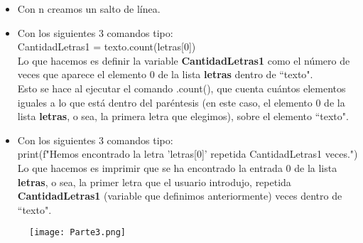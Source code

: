 \documentclass[15pt]{article}
\begin{document}
\begin{itemize}

    \item Con n creamos un salto de línea.
    \item Con los siguientes 3 comandos tipo:\\
    
    CantidadLetras1 = texto.count(letras[0])\\
    
    Lo que hacemos es definir la variable \textbf{CantidadLetras1} como el número de veces que aparece el elemento 0 de la lista \textbf{letras} dentro de ``texto".\\

    Esto se hace al ejecutar el comando .count(), que cuenta cuántos elementos iguales a lo que está dentro del paréntesis (en este caso, el elemento 0 de la lista \textbf{letras}, o sea, la primera letra que elegimos), sobre el elemento ``texto".
    \item Con los siguientes 3 comandos tipo:\\
    
    print(f"Hemos encontrado la letra '{letras[0]}' repetida {CantidadLetras1} veces.")\\

    Lo que hacemos es imprimir que se ha encontrado la entrada 0 de la lista \textbf{letras}, o sea, la primer letra que el usuario introdujo, repetida \textbf{CantidadLetras1} (variable que definimos anteriormente) veces dentro de ``texto".

\end{itemize}

\begin{figure}[h]
\centering
\texttt{[image: Parte3.png]}
\end{figure}
\end{document}
